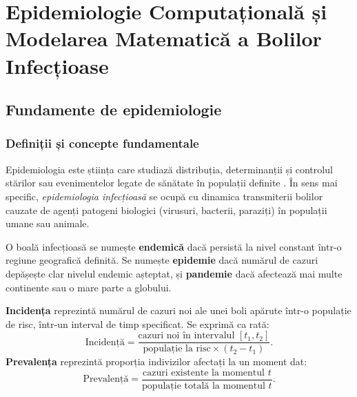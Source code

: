 
\chapter{Epidemiologie Computațională și Modelarea Matematică a Bolilor Infecțioase}
\label{ch:epidemiologie}

\section{Fundamente de epidemiologie}
\label{sec:fundamente_epi}

\subsection{Definiții și concepte fundamentale}
\label{subsec:definitii_epi}

Epidemiologia este știința care studiază distribuția, determinanții și controlul
stărilor sau evenimentelor legate de sănătate în populații definite
\cite{andersonmay1991}. În sens mai specific, \emph{epidemiologia infecțioasă}
se ocupă cu dinamica transmiterii bolilor cauzate de agenți patogeni biologici
(virusuri, bacterii, paraziți) în populații umane sau animale.

\begin{definitie}
O boală infecțioasă se numește \textbf{endemică} dacă persistă la nivel constant
într-o regiune geografică definită. Se numește \textbf{epidemie} dacă numărul de
cazuri depășește clar nivelul endemic așteptat, și \textbf{pandemie}
dacă afectează mai multe continente sau o mare parte a globului.
\end{definitie}

\begin{definitie}
\textbf{Incidența} reprezintă numărul de cazuri noi ale unei boli apărute într-o
populație de risc, într-un interval de timp specificat. Se exprimă ca rată:
\begin{equation}
    \text{Incidență} = \frac{\text{cazuri noi în intervalul } [t_1, t_2]}
                            {\text{populație la risc} \times (t_2 - t_1)}.
\end{equation}
\textbf{Prevalența} reprezintă proporția indivizilor afectați la un moment dat:
\begin{equation}
    \text{Prevalență} = \frac{\text{cazuri existente la momentul } t}
                             {\text{populație totală la momentul } t}.
\end{equation}
\end{definitie}

